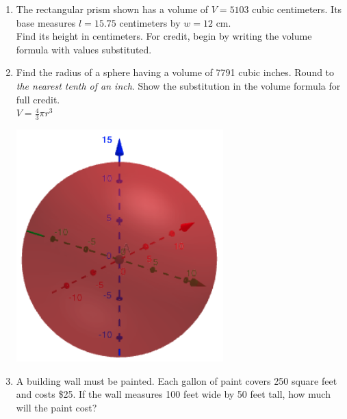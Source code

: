 \begin{enumerate}
\item The rectangular prism shown has a volume of $V=5103$ cubic centimeters. Its base measures $l=15.75$ centimeters by $w=12$ cm. \\[0.5cm]
Find its height in centimeters. For credit, begin by writing the volume formula with values substituted.
\begin{flushright}
\end{flushright}

\item Find the radius of a sphere having a volume of 7791 cubic inches. Round to \emph{the nearest tenth of an inch}. Show the substitution in the volume formula for full credit. \\[0.5cm]
$\displaystyle V = \frac{4}{3} \pi r^3$
  \begin{flushright}
    \includegraphics[width=8cm]{../graphics/04sphere.png}
  \end{flushright}

\item A building wall must be painted. Each gallon of paint covers 250 square feet and costs \$25. If the wall measures 100 feet wide by 50 feet tall, how much will the paint cost?


\end{enumerate}
